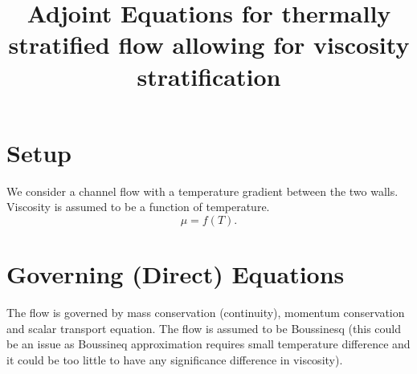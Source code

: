 \documentclass[preprint,12pt]{article}
\title{\vspace{-0.75in}Adjoint Equations for thermally stratified flow allowing for viscosity stratification\vspace{-0.5in}}
\begin{document}
\maketitle	
\vspace{-0.6in}
\section{Setup}
We consider a channel flow with a temperature gradient between the two walls. Viscosity is assumed to be a function of temperature. 
\begin{equation}
\mu=f(T).
\end{equation}
\section{Governing (Direct) Equations}
The flow is governed by mass conservation (continuity), momentum conservation and scalar transport equation. The flow is assumed to be Boussinesq (this could be an issue as Boussineq approximation requires small temperature difference and it could be too little to have any significance difference in viscosity).
\end{document}
